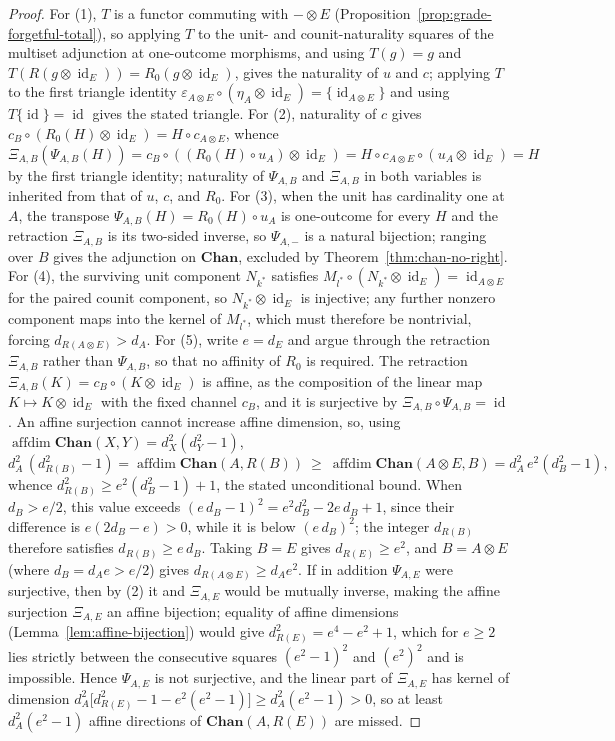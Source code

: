 \documentclass[11pt]{article}
\DeclareMathOperator{\affdim}{affdim}
\DeclareMathOperator{\id}{id}
\begin{document}
\begin{proof}
For (1), $T$ is a functor commuting with $-\otimes E$ (Proposition~\ref{prop:grade-forgetful-total}),
so applying $T$ to the unit- and counit-naturality squares of the multiset
adjunction at one-outcome morphisms, and using $T(g)=g$ and
$T(R(g\otimes\id_E))=R_0(g\otimes\id_E)$, gives the naturality of $u$ and $c$;
applying $T$ to the first triangle identity
$\varepsilon_{A\otimes E}\circ(\eta_A\otimes\id_E)=\{\id_{A\otimes E}\}$ and
using $T\{\id\}=\id$ gives the stated triangle. For (2), naturality of $c$ gives
$c_B\circ(R_0(H)\otimes\id_E)=H\circ c_{A\otimes E}$, whence
$\Xi_{A,B}(\Psi_{A,B}(H))=c_B\circ((R_0(H)\circ u_A)\otimes\id_E)
=H\circ c_{A\otimes E}\circ(u_A\otimes\id_E)=H$ by the first triangle identity;
naturality of $\Psi_{A,B}$ and $\Xi_{A,B}$ in both variables is inherited from
that of $u$, $c$, and $R_0$. For (3), when the unit has cardinality one at $A$,
the transpose $\Psi_{A,B}(H)=R_0(H)\circ u_A$ is one-outcome for every $H$ and
the retraction $\Xi_{A,B}$ is its two-sided inverse, so $\Psi_{A,-}$ is a natural
bijection; ranging over
$B$ gives the adjunction on $\mathbf{Chan}$, excluded by
Theorem~\ref{thm:chan-no-right}. For (4), the surviving unit component
$N_{k^{*}}$ satisfies $M_{l^{*}}\circ(N_{k^{*}}\otimes\id_E)=\id_{A\otimes E}$
for the paired counit component, so $N_{k^{*}}\otimes\id_E$ is injective; any
further nonzero component maps into the kernel of $M_{l^{*}}$, which must
therefore be nontrivial, forcing $d_{R(A\otimes E)}>d_A$. For (5), write $e=d_E$
and argue through the retraction $\Xi_{A,B}$ rather than $\Psi_{A,B}$, so that no
affinity of $R_0$ is required. The retraction $\Xi_{A,B}(K)=c_B\circ(K\otimes\id_E)$
is affine, as the composition of the linear map $K\mapsto K\otimes\id_E$ with the
fixed channel $c_B$, and it is surjective by $\Xi_{A,B}\circ\Psi_{A,B}=\id$. An
affine surjection cannot increase affine dimension, so, using
$\affdim\mathbf{Chan}(X,Y)=d_X^2(d_Y^2-1)$,
\[
d_A^2\,(d_{R(B)}^2-1)=\affdim\mathbf{Chan}(A,R(B))
\ \ge\ \affdim\mathbf{Chan}(A\otimes E,B)=d_A^2\,e^2(d_B^2-1),
\]
whence $d_{R(B)}^2\ge e^2(d_B^2-1)+1$, the stated unconditional bound. When
$d_B>e/2$, this value exceeds $(e\,d_B-1)^2=e^2d_B^2-2e\,d_B+1$, since their
difference is $e(2d_B-e)>0$, while it is below $(e\,d_B)^2$; the integer
$d_{R(B)}$ therefore satisfies $d_{R(B)}\ge e\,d_B$. Taking $B=E$ gives
$d_{R(E)}\ge e^2$, and $B=A\otimes E$ (where $d_B=d_Ae>e/2$) gives
$d_{R(A\otimes E)}\ge d_A e^2$. If in addition $\Psi_{A,E}$ were surjective, then
by (2) it and $\Xi_{A,E}$ would be mutually inverse, making the affine surjection
$\Xi_{A,E}$ an affine bijection; equality of affine dimensions
(Lemma~\ref{lem:affine-bijection}) would give $d_{R(E)}^2=e^4-e^2+1$, which for
$e\ge2$ lies strictly between the consecutive squares $(e^2-1)^2$ and $(e^2)^2$
and is impossible. Hence $\Psi_{A,E}$ is not surjective, and the linear part of
$\Xi_{A,E}$ has kernel of dimension
$d_A^2\bigl[d_{R(E)}^2-1-e^2(e^2-1)\bigr]\ge d_A^2(e^2-1)>0$, so at least
$d_A^2(e^2-1)$ affine directions of $\mathbf{Chan}(A,R(E))$ are missed.
\end{proof}
\end{document}
